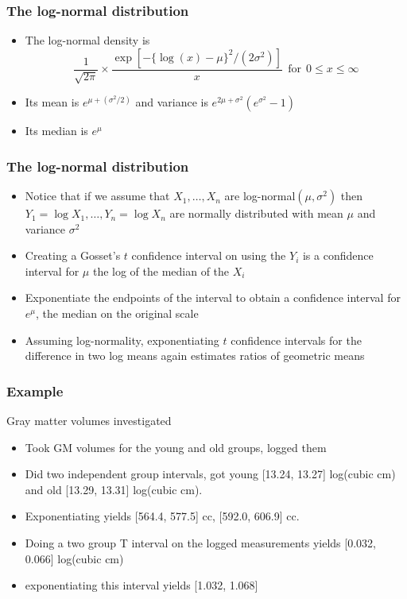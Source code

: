 \documentclass[aspectratio=169]{beamer}
\begin{document}
\begin{frame}\frametitle{The log-normal distribution}
\begin{itemize}
\item The log-normal density is
$$
\frac{1}{\sqrt{2\pi}} \times \frac{\exp[-\{\log(x) - \mu\}^2/ (2\sigma^2)]}{x}
~~\mbox{for}~~ 0\leq x \leq \infty
$$
\item Its mean is $e^{\mu + (\sigma^2 / 2)}$ and variance is $e^{2\mu + \sigma^2}(e^{ \sigma^2} - 1)$
\item Its median is $e^\mu$
\end{itemize}
\end{frame}

\begin{frame}\frametitle{The log-normal distribution}
\begin{itemize}
\item Notice that if we assume that $X_1,\ldots,X_n$ are 
   log-normal$(\mu,\sigma^2)$
  then $Y_1 = \log X_1,\ldots, Y_n = \log X_n$ are normally distributed
  with mean $\mu$ and variance $\sigma^2$
\item Creating a Gosset's $t$ confidence interval on using the $Y_i$
  is a confidence interval for $\mu$ the log of the median of the
  $X_i$
\item Exponentiate the endpoints of the interval to obtain a confidence interval
  for $e^\mu$, the median on the original scale
\item Assuming log-normality, exponentiating $t$ confidence intervals
  for the difference in two log means again estimates ratios of geometric
  means 
\end{itemize}
\end{frame}

\begin{frame}\frametitle{Example}
Gray matter volumes investigated
\begin{itemize}
\item Took GM volumes for the young and old groups, logged them
\item Did two independent group intervals, got 
young [13.24, 13.27] log(cubic cm) and old [13.29, 13.31] log(cubic cm).
\item  Exponentiating yields [564.4, 577.5] cc, [592.0, 606.9] cc.
\item Doing a two group T interval on the logged measurements yields [0.032, 0.066] log(cubic cm)
\item exponentiating this interval yields [1.032, 1.068]
\end{itemize}
\end{frame}
\end{document}
